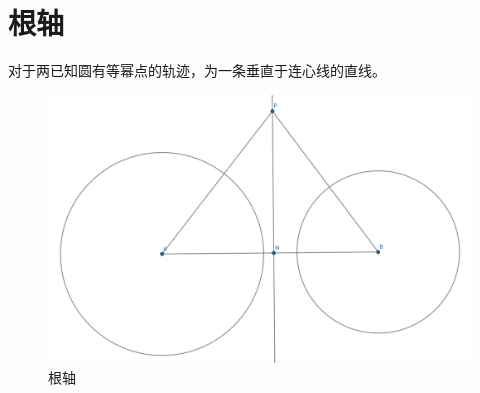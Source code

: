 \newpage 
\section{根轴}
\begin{theorem}[根轴]
    对于两已知圆有等幂点的轨迹，为一条垂直于连心线的直线。
\end{theorem}
\begin{figure}[H]
    \centering
    \includegraphics[width=0.7\linewidth]{figures/根轴.png}
    \caption{根轴}
\end{figure}

